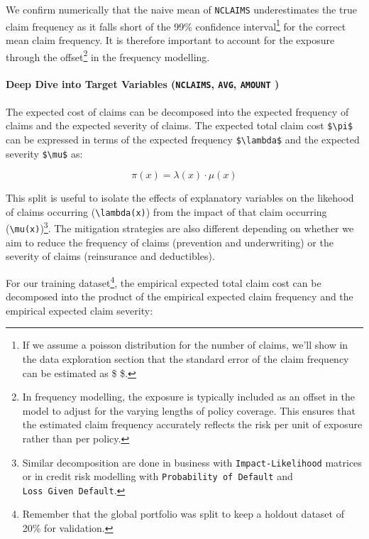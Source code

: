 \documentclass[
  english,
  11pt,
]{article}
\begin{document}
We confirm numerically that the naive mean of \texttt{NCLAIMS}
underestimates the true claim frequency as it falls short of the 99\%
confidence interval\footnote{If we assume a poisson distribution for the
  number of claims, we'll show in the data exploration section that the
  standard error of the claim frequency can be estimated as \$
   \$.} for the correct
mean claim frequency. It is therefore important to account for the
exposure through the offset\footnote{In frequency modelling, the
  exposure is typically included as an offset in the model to adjust for
  the varying lengths of policy coverage. This ensures that the
  estimated claim frequency accurately reflects the risk per unit of
  exposure rather than per policy.} in the frequency modelling.

\paragraph{\texorpdfstring{Deep Dive into Target Variables
(\texttt{NCLAIMS}, \texttt{AVG}, \texttt{AMOUNT}
)}{Deep Dive into Target Variables (NCLAIMS, AVG, AMOUNT )}}\label{deep-dive-into-target-variables-nclaims-avg-amount}

The expected cost of claims can be decomposed into the expected
frequency of claims and the expected severity of claims. The expected
total claim cost \texttt{\$\textbackslash{}pi\$} can be expressed in
terms of the expected frequency \texttt{\$\textbackslash{}lambda\$} and
the expected severity \texttt{\$\textbackslash{}mu\$} as:

\[\pi(x) = \lambda(x) \cdot \mu(x)\]

This split is useful to isolate the effects of explanatory variables on
the likehood of claims occurring (\texttt{\textbackslash{}lambda(x)})
from the impact of that claim occurring
(\texttt{\textbackslash{}mu(x)})\footnote{Similar decomposition are done
  in business with \texttt{Impact-Likelihood} matrices or in credit risk
  modelling with \texttt{Probability\ of\ Default} and
  \texttt{Loss\ Given\ Default}.}. The mitigation strategies are also
different depending on whether we aim to reduce the frequency of claims
(prevention and underwriting) or the severity of claims (reinsurance and
deductibles).

For our training dataset\footnote{Remember that the global portfolio was
  split to keep a holdout dataset of 20\% for validation.}, the
empirical expected total claim cost can be decomposed into the product
of the empirical expected claim frequency and the empirical expected
claim severity:
\end{document}
